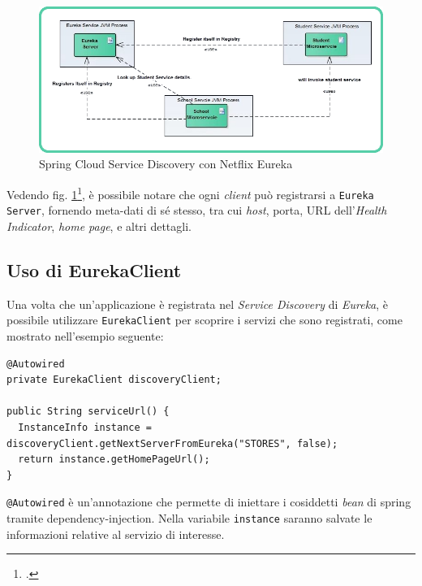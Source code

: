 \begin{figure}[H]
	\centering
	\includegraphics[width=\textwidth]{immagini/netflix-eureka.png}
	\caption[Spring Cloud Service Discovery con Netflix Eureka]{Spring Cloud Service Discovery con Netflix Eureka}
	\label{fig:netflix-eureka}
\end{figure}

Vedendo fig. \ref{fig:netflix-eureka}\footcite{site:fonte-netflix-eureka}, è possibile notare che ogni \textit{client} può registrarsi a \texttt{Eureka Server}, fornendo meta-dati di sé stesso, tra cui \textit{host}, porta, URL dell'\textit{Health Indicator}, \textit{home page}, e altri dettagli.

\subsection{Uso di EurekaClient} Una volta che un'applicazione è registrata nel \textit{Service Discovery} di \textit{Eureka}, è possibile utilizzare \texttt{EurekaClient} per scoprire i servizi che sono registrati, come mostrato nell'esempio seguente:

 \begin{tcolorbox}
 	\begin{lstlisting}
@Autowired
private EurekaClient discoveryClient;

public String serviceUrl() {
  InstanceInfo instance = discoveryClient.getNextServerFromEureka("STORES", false);
  return instance.getHomePageUrl();
}
 	\end{lstlisting}
 \end{tcolorbox}

\texttt{@Autowired} è un'annotazione che permette di iniettare i cosiddetti \textit{bean} di \gls{spring} tramite \gls{dependency-injection}\gloss. Nella variabile \texttt{instance} saranno salvate le informazioni relative al servizio di interesse.

